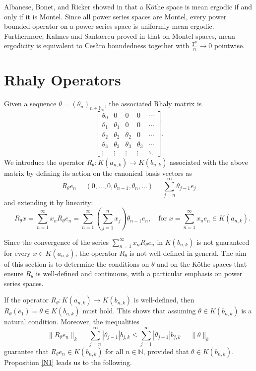 \documentclass{birkjour}
\theoremstyle{definition}
\theoremstyle{remark}
\numberwithin{equation}{section}
\begin{document}
Albanese, Bonet, and Ricker showed in \cite[Proposition 2.13]{ABR} that 
a Köthe space is mean ergodic if and only if it is Montel. Since all power 
series spaces are Montel, every power bounded operator on a power series 
space is uniformly mean ergodic. Furthermore, Kalmes and Santacreu proved 
in \cite[Theorem 2.5]{K1} that on Montel spaces, mean ergodicity is 
equivalent to Ces\`{a}ro boundedness together with 
$\displaystyle \frac{T^n}{n}\to 0$ pointwise.


\section{Rhaly Operators}
Given a sequence $\theta=(\theta_{n})_{n\in \mathbb{N}_{0}}$, the associated Rhaly matrix is
\[
\begin{bmatrix}
\theta_{0} &0&0&0&\cdots \\
\theta_{1}&\theta_{1}&0&0&\cdots\\
\theta_{2}&\theta_{2}&\theta_{2}&0&\cdots\\
\theta_{3}&\theta_{3}&\theta_{3}&\theta_{3}&\cdots\\
\vdots&\vdots&\vdots&\vdots&\ddots
\end{bmatrix}.
\]
We introduce the operator $R_{\theta}: K(a_{n,k})\to K(b_{n,k})$ associated with the above matrix by defining its action on the canonical basis vectors as
\[R_{\theta}e_{n}=(0,\dots,0, \theta_{n-1},\theta_{n},\dots)=\sum^{\infty}_{j=n}\theta_{j-1}e_{j}\]
and extending it by linearity:
\begin{equation*}\label{E1} 
\quad R_{\theta}x=\sum^{\infty}_{n=1}x_{n} R_{\theta}e_{n}= \sum^{\infty}_{n=1}\left(\sum^{n}_{j=1} x_{j}\right)\theta_{n-1}e_{n}, \quad \text{for } x=\sum^{\infty}_{n=1}x_{n}e_{n}\in K(a_{n,k}).
\end{equation*}

Since the convergence of the series $\displaystyle \sum_{n=1}^\infty x_n R_\theta e_n$ in $K(b_{n,k})$ is not guaranteed for every $x \in K(a_{n,k})$, the operator $R_\theta$ is not well-defined in general. The aim of this section is to determine the conditions on $\theta$ and on the Köthe spaces that ensure $R_\theta$ is well-defined and continuous, with a particular emphasis on power series spaces.

If the operator $R_{\theta}:K(a_{n,k})\to K(b_{n,k})$ is well-defined, then $R_{\theta}(e_1)=\theta\in K(b_{n,k})$ must hold. This shows that assuming $\theta\in K(b_{n,k})$ is a natural condition. Moreover, the inequalities
\[
\|R_{\theta}e_{n}\|_{k}=\sum^{\infty}_{j=n}|\theta_{j-1}|b_{j,k} \leq \sum^{\infty}_{j=1}|\theta_{j-1}|b_{j,k}=\|\theta\|_{k}
\]
guarantee that $R_{\theta}e_{n}\in K(b_{n,k})$ for all $n\in \mathbb{N}$, provided that $\theta\in K(b_{n,k})$. Proposition \ref{N1} leads us to the following.
\end{document}

